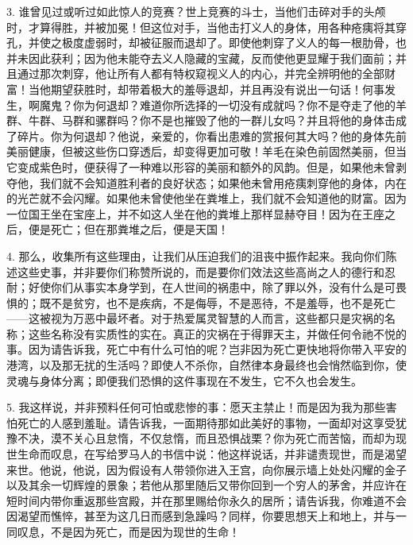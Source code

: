 3. 谁曾见过或听过如此惊人的竞赛？世上竞赛的斗士，当他们击碎对手的头颅时，才算得胜，并被加冕！但这位对手，当他击打义人的身体，用各种疮痍将其穿孔，并使之极度虚弱时，却被征服而退却了。即使他刺穿了义人的每一根肋骨，也并未因此获利；因为他未能夺去义人隐藏的宝藏，反而使他更显耀于我们面前；并且通过那次刺穿，他让所有人都有特权窥视义人的内心，并完全辨明他的全部财富！当他期望获胜时，却带着极大的羞辱退却，并且再没有说出一句话！何事发生，啊魔鬼？你为何退却？难道你所选择的一切没有成就吗？你不是夺走了他的羊群、牛群、马群和骡群吗？你不是也摧毁了他的一群儿女吗？并且将他的身体击成了碎片。你为何退却？他说，亲爱的，你看出患难的赏报何其大吗？他的身体先前美丽健康，但被这些伤口穿透后，却变得更加可敬！羊毛在染色前固然美丽，但当它变成紫色时，便获得了一种难以形容的美丽和额外的风韵。但是，如果他未曾剥夺他，我们就不会知道胜利者的良好状态；如果他未曾用疮痍刺穿他的身体，内在的光芒就不会闪耀。如果他未曾使他坐在粪堆上，我们就不会知道他的财富。因为一位国王坐在宝座上，并不如这人坐在他的粪堆上那样显赫夺目！因为在王座之后，便是死亡；但在那粪堆之后，便是天国！\par

4. 那么，收集所有这些理由，让我们从压迫我们的沮丧中振作起来。我向你们陈述这些史事，并非要你们称赞所说的，而是要你们效法这些高尚之人的德行和忍耐；好使你们从事实本身学到，在人世间的祸患中，除了罪以外，没有什么是可畏惧的；既不是贫穷，也不是疾病，不是侮辱，不是恶待，不是羞辱，也不是死亡——这被视为万恶中最坏者。对于热爱属灵智慧的人而言，这些都只是灾祸的名称；这些名称没有实质性的实在。真正的灾祸在于得罪天主，并做任何令祂不悦的事。因为请告诉我，死亡中有什么可怕的呢？岂非因为死亡更快地将你带入平安的港湾，以及那无扰的生活吗？即使人不杀你，自然律本身最终也会悄然临到你，使灵魂与身体分离；即便我们恐惧的这件事现在不发生，它不久也会发生。\par

5. 我这样说，并非预料任何可怕或悲惨的事：愿天主禁止！而是因为我为那些害怕死亡的人感到羞耻。请告诉我，一面期待那如此美好的事物，一面却对这享受犹豫不决，漠不关心且怠惰，不仅怠惰，而且恐惧战栗？你为死亡而苦恼，而却为现世生命而叹息，在写给罗马人的书信中说：他这样说话，并非谴责现世，而是渴望来世。他说，他说，因为假设有人带领你进入王宫，向你展示墙上处处闪耀的金子以及其余一切辉煌的景象；若他从那里随后又带你回到一个穷人的茅舍，并应许在短时间内带你重返那些宫殿，并在那里赐给你永久的居所；请告诉我，你难道不会因渴望而憔悴，甚至为这几日而感到急躁吗？同样，你要思想天上和地上，并与一同叹息，不是因为死亡，而是因为现世的生命！\par

